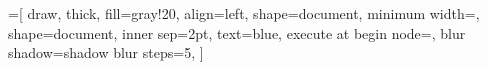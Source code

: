 \documentclass[16pt]{book}
\begin{document}



\tableofcontents

\newpage
\listoffigures

=[%
draw,
thick,
fill=gray!20,
align=left,
shape=document,
minimum width=,
shape=document,
inner sep=2pt,
text=blue,
execute at begin node=\setlength{\baselineskip}{19pt},
blur shadow={shadow blur steps=5},
]





%
%
%
%
%
%
%
%
%
%
\end{document}

